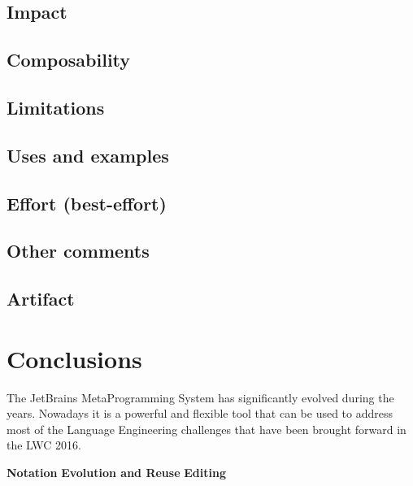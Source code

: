 \documentclass[preprint,numbers,10pt]{sigplanconf}
\begin{document}
\subsection{Impact}

\subsection{Composability}

\subsection{Limitations}

\subsection{Uses and examples}

\subsection{Effort (best-effort)}

\subsection{Other comments}

\subsection{Artifact}

%
%

\section{Conclusions}

The JetBrains MetaProgramming System has significantly evolved during the years. Nowadays it is a powerful and flexible tool that can be used to address most of the Language Engineering challenges that have been brought forward in the LWC 2016.

\textbf{Notation}
\textbf{Evolution and Reuse}
\textbf{Editing}



\end{document}
